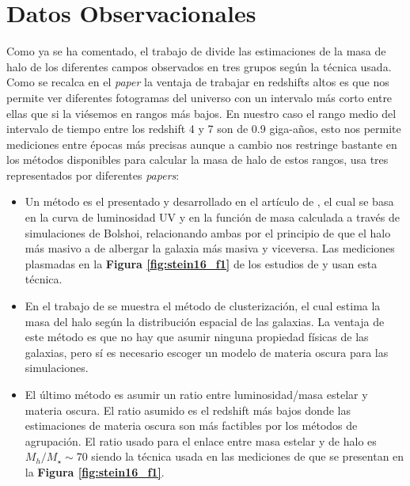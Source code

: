 \section{Datos Observacionales}
Como ya se ha comentado, el trabajo de \cite{steinhardt2016impossibly} divide las estimaciones de la masa de halo de los diferentes campos observados en tres grupos según la técnica usada. Como se recalca en el \textit{paper} \cite{steinhardt2016impossibly} la ventaja de trabajar en redshifts altos es que nos permite ver diferentes fotogramas del universo con un intervalo más corto entre ellas que si la viésemos en rangos más bajos. En nuestro caso el rango medio del intervalo de tiempo entre los redshift 4 y 7 son de 0.9 giga-años, esto nos permite mediciones entre épocas más precisas aunque a cambio nos restringe bastante en los métodos disponibles para calcular la masa de halo de estos rangos, \cite{steinhardt2016impossibly} usa tres representados por diferentes \textit{papers}:
\begin{itemize}

	\item Un método es el presentado y desarrollado en el artículo de \cite{finkelstein2015increasing}, el cual se basa en la curva de luminosidad UV y en la función de masa calculada a través de simulaciones de Bolshoi, relacionando ambas por el principio de que el halo más masivo a de albergar la galaxia más masiva y viceversa. Las mediciones plasmadas en la \textbf{Figura \ref{fig:stein16_f1}} de los estudios de \cite{bouwens2015reionization} y \cite{bouwens2015uv} usan esta técnica.

\item En el trabajo de \cite{hildebrandt2009cars} se muestra el método de clusterización, el cual estima la masa del halo según la distribución espacial de las galaxias. La ventaja de este método es que no hay que asumir ninguna propiedad físicas de las galaxias, pero sí es necesario escoger un modelo de materia oscura para las simulaciones.

	\item El último método es asumir un ratio entre luminosidad/masa estelar y materia oscura. El ratio asumido es el redshift más bajos donde las estimaciones de materia oscura son más factibles por los métodos de agrupación. El ratio usado para el enlace entre masa estelar y de halo es $M_h/M_\star \sim 70 $ siendo la técnica usada en las mediciones de \cite{steinhardt2014uniform} que se presentan en la \textbf{Figura \ref{fig:stein16_f1}}.
\end{itemize}

